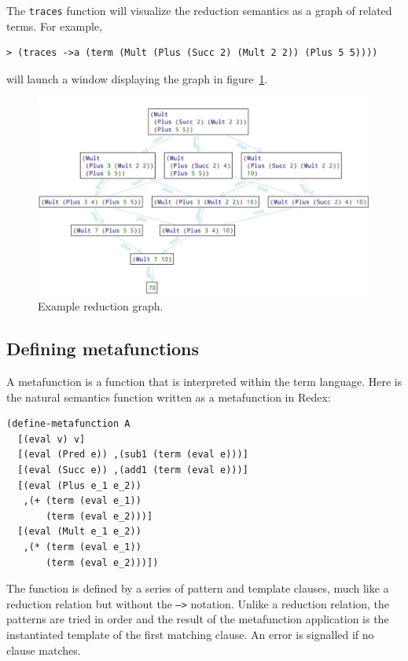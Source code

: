 The {\tt traces} function will visualize the reduction semantics as a
graph of related terms.  For example,
\begin{verbatim}
> (traces ->a (term (Mult (Plus (Succ 2) (Mult 2 2)) (Plus 5 5))))
\end{verbatim}
will launch a window displaying the graph in figure~\ref{fig:graph}.
\begin{figure}
\begin{center}
\includegraphics[width=5in]{figs/reduction-graph.pdf}
\end{center}
\caption{Example reduction graph.}
\label{fig:graph}
\end{figure}


\subsection{Defining metafunctions}

A metafunction is a function that is interpreted within the term
language.  Here is the natural semantics function written as a
metafunction in Redex:
\begin{verbatim}
(define-metafunction A
  [(eval v) v]
  [(eval (Pred e)) ,(sub1 (term (eval e)))]
  [(eval (Succ e)) ,(add1 (term (eval e)))]  
  [(eval (Plus e_1 e_2)) 
   ,(+ (term (eval e_1))
       (term (eval e_2)))]
  [(eval (Mult e_1 e_2))
   ,(* (term (eval e_1))
       (term (eval e_2)))])
\end{verbatim}

The function is defined by a series of pattern and template clauses,
much like a reduction relation but without the {\tt -->} notation.
Unlike a reduction relation, the patterns are tried in order and the
result of the metafunction application is the instantiated template of
the first matching clause.  An error is signalled if no clause
matches.


